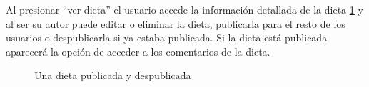 Al presionar “ver dieta” el usuario accede la información detallada de la dieta \ref{fig:mis_dietas_info} y al ser su autor puede editar o eliminar la dieta,  publicarla para el resto de los usuarios o despublicarla si ya estaba publicada. Si la dieta está publicada aparecerá la opción de acceder a los comentarios de la dieta.
\begin{figure}[H]
    \centering
    \caption{Una dieta publicada y despublicada}
    \label{fig:mis_dietas_info}
\end{figure}

